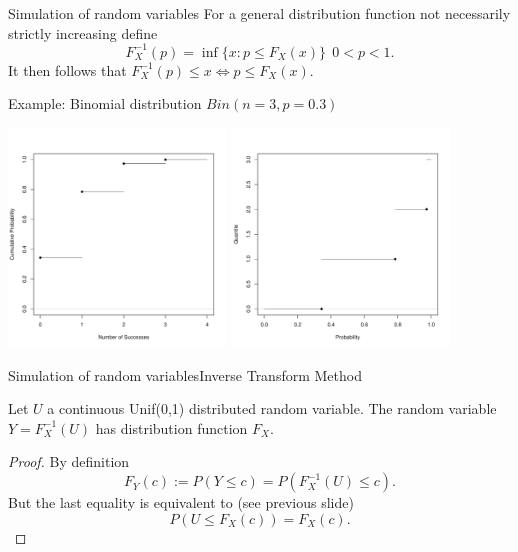 \documentclass[handout]{beamer}
\begin{document}
\begin{frame}{Simulation of random variables}
For a general distribution function not necessarily strictly increasing define 
\[F_X^{-1}(p) = \inf \{x : p \leq F_X(x) \}  \ \ 0 < p < 1.\]
It then follows that
$F_X^{-1}(p) \leq x   \Longleftrightarrow p \leq F_X(x).$
\vspace{0.2cm}
\begin{center}
Example: Binomial distribution $Bin(n=3,p=0.3)$ 
\end{center}
\vspace{-0.7cm}
\begin{center}
 \includegraphics[width=5.8cm,keepaspectratio=true]{./distBinomiale.pdf}
 \includegraphics[width=5.8cm,keepaspectratio=true]{./quantileBinomiale.pdf}
\end{center}
\end{frame}

\begin{frame}{Simulation of random variables}{Inverse Transform Method}
\begin{theorem}
Let $U$ a continuous Unif(0,1) distributed random variable. The random variable $Y=F_X^{-1}(U)$ has distribution 
function $F_X$.
\end{theorem}
\begin{proof}
By definition 
\[ F_Y(c) := P(Y \leq c) = P(F_X^{-1}(U)\leq c).
\]
But the last equality is equivalent to (see previous slide) 
\[
P(U\leq F_X(c)) = F_X(c).
\]
\end{proof}
\end{frame}
\end{document}
